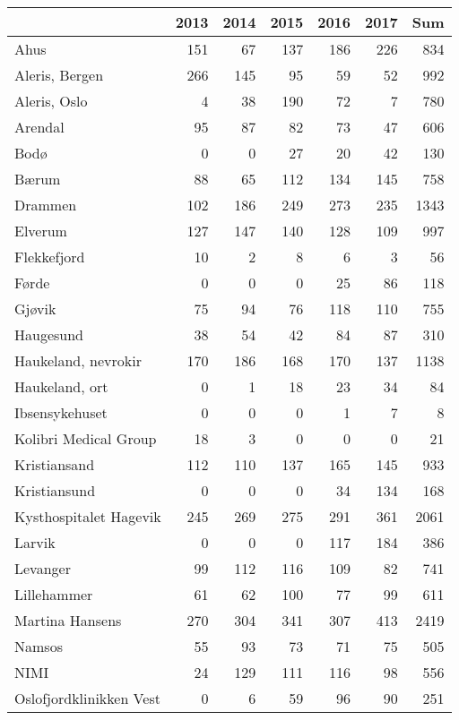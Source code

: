 \documentclass [norsk,a4paper,twoside]{article}\usepackage[]{graphicx}\usepackage[]{color}
\begin{document}
\begin{table}[ht]
\centering
\begin{tabular}{lrrrrrr}
  \hline
 & 2013 & 2014 & 2015 & 2016 & 2017 & Sum \\ 
  \hline
Ahus & 151 & 67 & 137 & 186 & 226 & 834 \\ 
  Aleris, Bergen & 266 & 145 & 95 & 59 & 52 & 992 \\ 
  Aleris, Oslo & 4 & 38 & 190 & 72 & 7 & 780 \\ 
  Arendal & 95 & 87 & 82 & 73 & 47 & 606 \\ 
  Bodø & 0 & 0 & 27 & 20 & 42 & 130 \\ 
  Bærum & 88 & 65 & 112 & 134 & 145 & 758 \\ 
  Drammen & 102 & 186 & 249 & 273 & 235 & 1343 \\ 
  Elverum & 127 & 147 & 140 & 128 & 109 & 997 \\ 
  Flekkefjord & 10 & 2 & 8 & 6 & 3 & 56 \\ 
  Førde & 0 & 0 & 0 & 25 & 86 & 118 \\ 
  Gjøvik & 75 & 94 & 76 & 118 & 110 & 755 \\ 
  Haugesund & 38 & 54 & 42 & 84 & 87 & 310 \\ 
  Haukeland, nevrokir & 170 & 186 & 168 & 170 & 137 & 1138 \\ 
  Haukeland, ort & 0 & 1 & 18 & 23 & 34 & 84 \\ 
  Ibsensykehuset & 0 & 0 & 0 & 1 & 7 & 8 \\ 
  Kolibri Medical Group & 18 & 3 & 0 & 0 & 0 & 21 \\ 
  Kristiansand & 112 & 110 & 137 & 165 & 145 & 933 \\ 
  Kristiansund & 0 & 0 & 0 & 34 & 134 & 168 \\ 
  Kysthospitalet Hagevik & 245 & 269 & 275 & 291 & 361 & 2061 \\ 
  Larvik & 0 & 0 & 0 & 117 & 184 & 386 \\ 
  Levanger & 99 & 112 & 116 & 109 & 82 & 741 \\ 
  Lillehammer & 61 & 62 & 100 & 77 & 99 & 611 \\ 
  Martina Hansens & 270 & 304 & 341 & 307 & 413 & 2419 \\ 
  Namsos & 55 & 93 & 73 & 71 & 75 & 505 \\ 
  NIMI & 24 & 129 & 111 & 116 & 98 & 556 \\ 
  Oslofjordklinikken Vest & 0 & 6 & 59 & 96 & 90 & 251 \\ 

\end{tabular}
\end{table}
\end{document}
